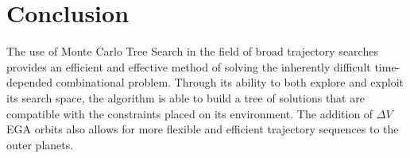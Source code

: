 \documentclass[letterpaper, preprint, paper,11pt]{AAS}	%
\begin{document}
\section{Conclusion}

The use of Monte Carlo Tree Search in the field of broad trajectory searches provides an efficient and effective method of solving the inherently difficult time-depended combinational problem. Through its ability to both explore and exploit its search space, the algorithm is able to build a tree of solutions that are compatible with the constraints placed on its environment. The addition of $\Delta V$EGA orbits also allows for more flexible and efficient trajectory sequences to the outer planets.

\appendix
\clearpage
\end{document}

